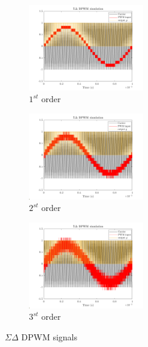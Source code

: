 \documentclass[11pt,a4paper]{article}
\begin{document}
\begin{figure}[H]
	\begin{subfigure}[b]{0.3\textwidth}
		\includegraphics[width=50mm]{images/simulation1order.png}
		\caption{$1^{st}$ order}
	\end{subfigure}
	\hfill
	\begin{subfigure}[b]{0.3\textwidth}
		\includegraphics[width=50mm]{images/simulation2order.png}
		\caption{$2^{st}$ order}
	\end{subfigure}
	\hfill
	\begin{subfigure}[b]{0.3\textwidth}
		\includegraphics[width=50mm]{images/simulation3order.png}
		\caption{$3^{st}$ order}
	\end{subfigure}
	\caption{$\Sigma\Delta$ DPWM signals}
	\label{system}
\end{figure}
\end{document}
